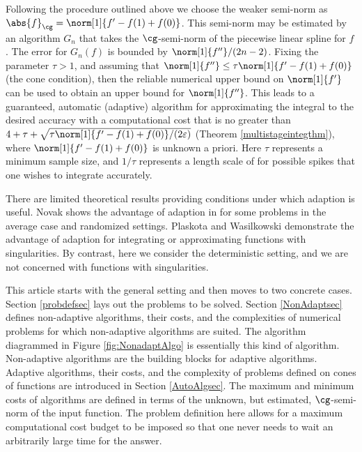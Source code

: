 \documentclass[]{elsarticle}
\theoremstyle{definition}
\theoremstyle{remark}
\newcommand{\Gnorm}[1]{\abs{#1}_{\cg}}
\begin{document}
Following the procedure outlined above we choose the weaker semi-norm as $\Gnorm{f} = \norm[1]{f'-f(1)+f(0)}$.  This semi-norm may be estimated by an algorithm $G_n$ that takes the $\cg$-semi-norm of the piecewise linear spline for $f$.  The error for $G_n(f)$ is bounded by $\norm[1]{f''}/(2n-2)$.  Fixing the parameter $\tau > 1$, and assuming that $\norm[1]{f''} \le \tau \norm[1]{f'-f(1)+f(0)}$  (the cone condition), then the reliable numerical upper bound on $\norm[1]{f'}$ can be used to obtain an upper bound for $\norm[1]{f''}$.   
This leads to a guaranteed, automatic (adaptive) algorithm for approximating the integral to the desired accuracy with a computational cost that is no greater than $4+ \tau + \sqrt{\tau \norm[1]{f'-f(1)+f(0)}/(2\varepsilon)}$ (Theorem \ref{multistageintegthm}), where $\norm[1]{f'-f(1)+f(0)}$ is unknown a priori.  Here $\tau$ represents a minimum sample size, and $1/\tau$ represents a length scale of for possible spikes that one wishes to integrate accurately.

There are limited theoretical results providing conditions under which adaption is useful.  Novak \cite{Nov96a} shows the advantage of adaption in for some problems in the average case and randomized settings.  Plaskota and Wasilkowski \cite{PlaWas05a,PlaEtal08a} demonstrate the advantage of adaption for integrating or approximating functions with singularities. By contrast, here we consider the deterministic setting, and we are not concerned with functions with singularities.

This article starts with the general setting and then moves to two concrete cases.  Section \ref{probdefsec} lays out the problems to be solved.  Section \ref{NonAdaptsec} defines non-adaptive algorithms, their costs, and the complexities of numerical problems for which non-adaptive algorithms are suited.  The algorithm diagrammed in Figure \ref{fig:NonadaptAlgo} is essentially this kind of algorithm.  Non-adaptive algorithms are the building blocks for adaptive algorithms.  Adaptive algorithms, their costs, and the complexity of problems defined on cones of functions are introduced in Section \ref{AutoAlgsec}.  The maximum and minimum costs of algorithms are defined in terms of the unknown, but estimated, $\cg$-semi-norm of the input function.  The problem definition here allows for a maximum computational cost budget to be imposed so that one never needs to wait an arbitrarily large time for the answer.  
\end{document}
